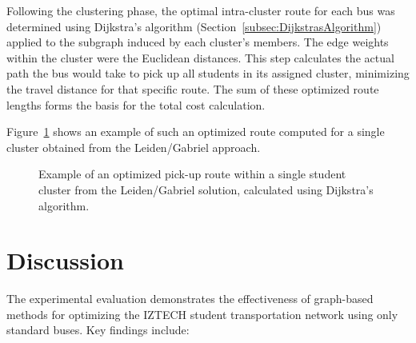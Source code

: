 Following the clustering phase, the optimal intra-cluster route for each bus was determined using Dijkstra's algorithm (Section~\ref{subsec:DijkstrasAlgorithm}) applied to the subgraph induced by each cluster's members. The edge weights within the cluster were the Euclidean distances. This step calculates the actual path the bus would take to pick up all students in its assigned cluster, minimizing the travel distance for that specific route. The sum of these optimized route lengths forms the basis for the total cost calculation.

Figure~\ref{fig:example_optimized_route} shows an example of such an optimized route computed for a single cluster obtained from the Leiden/Gabriel approach.

\begin{figure}[h]
    \centering
    \caption{Example of an optimized pick-up route within a single student cluster from the Leiden/Gabriel solution, calculated using Dijkstra's algorithm.}
    \label{fig:example_optimized_route}
\end{figure}

\section{Discussion}
\label{sec:discussion}

The experimental evaluation demonstrates the effectiveness of graph-based methods for optimizing the IZTECH student transportation network using only standard buses. Key findings include:

